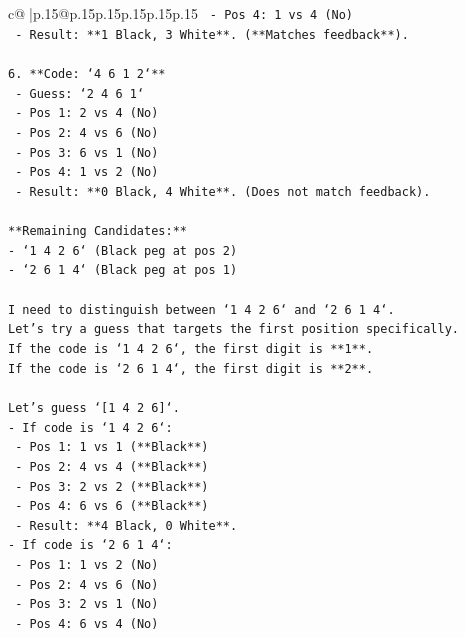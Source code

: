 \documentclass{article}
\begin{document}
{\begin{supertabular}{c@{$\;$}|p{.15\linewidth}@{}p{.15\linewidth}p{.15\linewidth}p{.15\linewidth}p{.15\linewidth}p{.15\linewidth}}
{{{\texttt{    {-} Pos 4: 1 vs 4 (No)} \\
\texttt{    {-} Result: **1 Black, 3 White**. (**Matches feedback**).} \\
\\ 
\texttt{6.  **Code: `4 6 1 2`**} \\
\texttt{    {-} Guess: `2 4 6 1`} \\
\texttt{    {-} Pos 1: 2 vs 4 (No)} \\
\texttt{    {-} Pos 2: 4 vs 6 (No)} \\
\texttt{    {-} Pos 3: 6 vs 1 (No)} \\
\texttt{    {-} Pos 4: 1 vs 2 (No)} \\
\texttt{    {-} Result: **0 Black, 4 White**. (Does not match feedback).} \\
\\ 
\texttt{**Remaining Candidates:**} \\
\texttt{{-} `1 4 2 6` (Black peg at pos 2)} \\
\texttt{{-} `2 6 1 4` (Black peg at pos 1)} \\
\\ 
\texttt{I need to distinguish between `1 4 2 6` and `2 6 1 4`.} \\
\texttt{Let's try a guess that targets the first position specifically.} \\
\texttt{If the code is `1 4 2 6`, the first digit is **1**.} \\
\texttt{If the code is `2 6 1 4`, the first digit is **2**.} \\
\\ 
\texttt{Let's guess `{[}1 4 2 6{]}`.} \\
\texttt{{-} If code is `1 4 2 6`:} \\
\texttt{  {-} Pos 1: 1 vs 1 (**Black**)} \\
\texttt{  {-} Pos 2: 4 vs 4 (**Black**)} \\
\texttt{  {-} Pos 3: 2 vs 2 (**Black**)} \\
\texttt{  {-} Pos 4: 6 vs 6 (**Black**)} \\
\texttt{  {-} Result: **4 Black, 0 White**.} \\
\texttt{{-} If code is `2 6 1 4`:} \\
\texttt{  {-} Pos 1: 1 vs 2 (No)} \\
\texttt{  {-} Pos 2: 4 vs 6 (No)} \\
\texttt{  {-} Pos 3: 2 vs 1 (No)} \\
\texttt{  {-} Pos 4: 6 vs 4 (No)} \\
}}}
\end{supertabular}}
\end{document}
